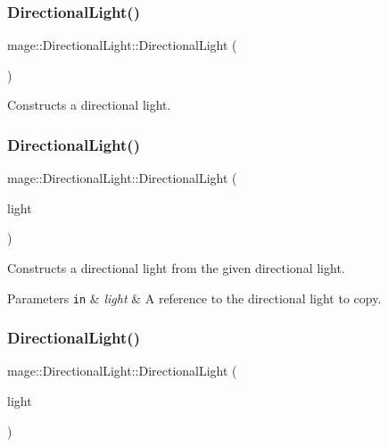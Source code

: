 \subsubsection{\texorpdfstring{Directional\+Light()}{DirectionalLight()}\hspace{0.1cm}{\footnotesize\ttfamily [1/3]}}
{\footnotesize\ttfamily mage\+::\+Directional\+Light\+::\+Directional\+Light (\begin{DoxyParamCaption}{ }\end{DoxyParamCaption})}

Constructs a directional light. \hypertarget{classmage_1_1_directional_light_a777b1b8e00a51ba84f6af774a7b519ea}{}\label{classmage_1_1_directional_light_a777b1b8e00a51ba84f6af774a7b519ea} 
\subsubsection{\texorpdfstring{Directional\+Light()}{DirectionalLight()}\hspace{0.1cm}{\footnotesize\ttfamily [2/3]}}
{\footnotesize\ttfamily mage\+::\+Directional\+Light\+::\+Directional\+Light (\begin{DoxyParamCaption}\item[{const \hyperlink{classmage_1_1_directional_light}{Directional\+Light} \&}]{light }\end{DoxyParamCaption})\hspace{0.3cm}{\ttfamily [default]}}

Constructs a directional light from the given directional light.


\begin{DoxyParams}[1]{Parameters}
\mbox{\tt in}  & {\em light} & A reference to the directional light to copy. \\
\hline
\end{DoxyParams}
\hypertarget{classmage_1_1_directional_light_a9563b260b550057e951500c40ecbe2d3}{}\label{classmage_1_1_directional_light_a9563b260b550057e951500c40ecbe2d3} 
\subsubsection{\texorpdfstring{Directional\+Light()}{DirectionalLight()}\hspace{0.1cm}{\footnotesize\ttfamily [3/3]}}
{\footnotesize\ttfamily mage\+::\+Directional\+Light\+::\+Directional\+Light (\begin{DoxyParamCaption}\item[{\hyperlink{classmage_1_1_directional_light}{Directional\+Light} \&\&}]{light }\end{DoxyParamCaption})\hspace{0.3cm}{\ttfamily [default]}}

